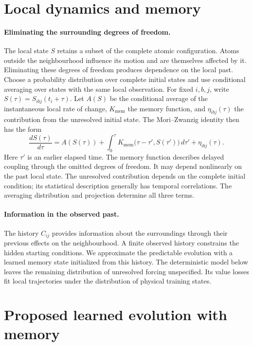 \documentclass[11pt,a4paper]{article}
\begin{document}
\section{Local dynamics and memory}

\paragraph{Eliminating the surrounding degrees of freedom.}
The local state $S$ retains a subset of the complete atomic configuration.
Atoms outside the neighbourhood influence its motion and are themselves
affected by it. Eliminating these degrees of freedom produces dependence on
the local past. Choose a probability distribution over complete initial
states and use conditional averaging over states with the same local
observation. For fixed $i,b,j$, write $S(\tau)=S_{ibj}(t_i+\tau)$.
Let $A(S)$ be the conditional average of the instantaneous local rate of
change, $K_{\mathrm{mem}}$ the memory function, and $\eta_{ibj}(\tau)$ the
contribution from the unresolved initial state. The Mori--Zwanzig identity
then has the form~\cite{lin2021,gupta2025}
\[
\boxed{
\frac{dS(\tau)}{d\tau}
=A(S(\tau))
+\int_0^\tau K_{\mathrm{mem}}\bigl(\tau-\tau',S(\tau')\bigr)\,d\tau'
+\eta_{ibj}(\tau).
}
\]
Here $\tau'$ is an earlier elapsed time. The memory function describes
delayed coupling through the omitted degrees of freedom. It may depend
nonlinearly on the past local state. The unresolved contribution depends on
the complete initial condition; its statistical description generally has
temporal correlations. The averaging distribution and projection determine
all three terms.

\paragraph{Information in the observed past.}
The history $C_{ij}$ provides information about the surroundings through
their previous effects on the neighbourhood. A finite observed history
constrains the hidden starting conditions. We approximate the predictable
evolution with a learned memory state initialized from this history.
The deterministic model below leaves the remaining distribution of
unresolved forcing unspecified. Its value losses fit local trajectories
under the distribution of physical training states.

\section{Proposed learned evolution with memory}
\end{document}
